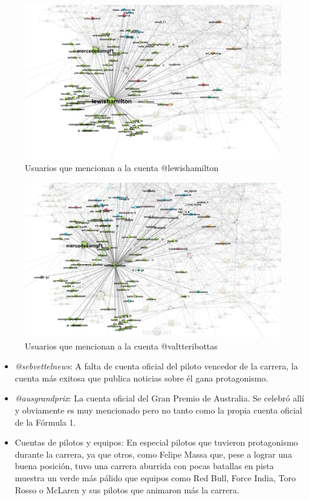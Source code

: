 \begin{figure}[H]
	\centering
	\includegraphics[width=14cm]{img/lewishamilton-mentions}
	\caption{Usuarios que mencionan a la cuenta @lewishamilton}
	\label{fig:lewishamilton-mentions}
\end{figure}

\begin{figure}[H]
	\centering
	\includegraphics[width=14cm]{img/valtteribottas-mentions}
	\caption{Usuarios que mencionan a la cuenta @valtteribottas}
	\label{fig:valtteribottas-mentions}
\end{figure}

\begin{itemize}	
	\item \textit{@sebvettelnews}: A falta de cuenta oficial del piloto vencedor de la carrera, la cuenta más exitosa que publica noticias sobre él gana protagonismo.
	\item \textit{@ausgrandprix}: La cuenta oficial del Gran Premio de Australia. Se celebró allí y obviamente es muy mencionado pero no tanto como la propia cuenta oficial de la Fórmula 1.
	\item Cuentas de pilotos y equipos: En especial pilotos que tuvieron protagonismo durante la carrera, ya que otros, como Felipe Massa que, pese a lograr una buena posición, tuvo una carrera aburrida con pocas batallas en pista muestra un verde más pálido que equipos como Red Bull, Force India, Toro Rosso o McLaren y sus pilotos que animaron más la carrera.
\end{itemize}


